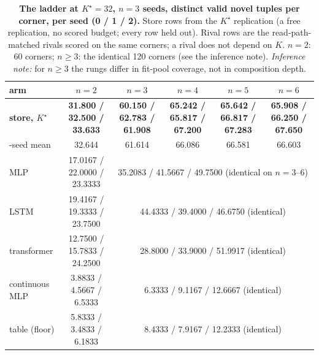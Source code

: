 \documentclass{article} %
\newcommand{\Kstar}{\ensuremath{K^{\star}}}
\begin{document}
\begin{table}[t]
\centering\small
\caption{\textbf{The ladder at $\Kstar=32$, $n=3$ seeds, distinct valid novel tuples per
corner, per seed (0 / 1 / 2).} Store rows from the $\Kstar$ replication (a free replication,
no scored budget; every row held out). Rival rows are the read-path-matched rivals scored on
the same corners; a rival does not depend on $K$. $n=2$: 60 corners; $n\ge3$: the identical
120 corners (see the inference note). \emph{Inference note:} for $n\ge3$ the rungs differ in
fit-pool coverage, not in composition depth.}
\label{tab:ladder}
\setlength{\tabcolsep}{2.6pt}
\begin{tabular}{lccccc}
\toprule
arm & $n=2$ & $n=3$ & $n=4$ & $n=5$ & $n=6$ \\
\midrule
\textbf{store, $\Kstar$} & \textbf{31.800 / 32.500 / 33.633} & \textbf{60.150 / 62.783 / 61.908} & \textbf{65.242 / 65.817 / 67.200} & \textbf{65.642 / 66.817 / 67.283} & \textbf{65.908 / 66.250 / 67.650} \\
\quad 3-seed mean & 32.644 & 61.614 & 66.086 & 66.581 & 66.603 \\
MLP & 17.0167 / 22.0000 / 23.3333 & \multicolumn{4}{c}{35.2083 / 41.5667 / 49.7500 (identical on $n=3$--$6$)} \\
LSTM & 19.4167 / 19.3333 / 23.7500 & \multicolumn{4}{c}{44.4333 / 39.4000 / 46.6750 (identical)} \\
transformer & 12.7500 / 15.7833 / 24.2500 & \multicolumn{4}{c}{28.8000 / 33.9000 / 51.9917 (identical)} \\
continuous MLP & 3.8833 / 4.5667 / 6.5333 & \multicolumn{4}{c}{6.3333 / 9.1167 / 12.6667 (identical)} \\
table (floor) & 5.8333 / 3.4833 / 6.1833 & \multicolumn{4}{c}{8.4333 / 7.9167 / 12.2333 (identical)} \\
\bottomrule
\end{tabular}
\end{table}
\end{document}
